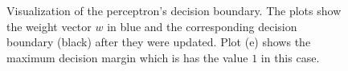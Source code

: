 \documentclass[12pt]{article}
\begin{document}
\begin{figure}[b!]
	\centering
	\hfill
	\hfill
	\hfill
	\hfill
	\caption[]{Visualization of the perceptron's decision boundary. The plots show the weight vector $w$ in blue  and the corresponding decision boundary (black) after they were updated. Plot (e) shows the maximum decision margin which is has the value $1$ in this case. }
	\label{fig:1.1}
\end{figure}
\end{document}
